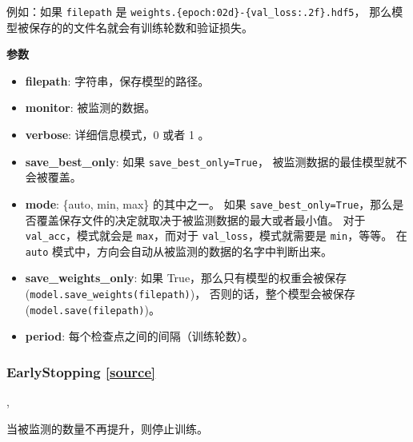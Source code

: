 例如：如果 \texttt{filepath} 是
\texttt{weights.\{epoch:02d\}-\{val\_loss:.2f\}.hdf5}，
那么模型被保存的的文件名就会有训练轮数和验证损失。

\textbf{参数}

\begin{itemize}
\tightlist
\item
  \textbf{filepath}: 字符串，保存模型的路径。
\item
  \textbf{monitor}: 被监测的数据。
\item
  \textbf{verbose}: 详细信息模式，0 或者 1 。
\item
  \textbf{save\_best\_only}: 如果 \texttt{save\_best\_only=True}，
  被监测数据的最佳模型就不会被覆盖。
\item
  \textbf{mode}: \{auto, min, max\} 的其中之一。 如果
  \texttt{save\_best\_only=True}，那么是否覆盖保存文件的决定就取决于被监测数据的最大或者最小值。
  对于 \texttt{val\_acc}，模式就会是 \texttt{max}，而对于
  \texttt{val\_loss}，模式就需要是 \texttt{min}，等等。 在 \texttt{auto}
  模式中，方向会自动从被监测的数据的名字中判断出来。
\item
  \textbf{save\_weights\_only}: 如果 True，那么只有模型的权重会被保存
  (\texttt{model.save\_weights(filepath)})， 否则的话，整个模型会被保存
  (\texttt{model.save(filepath)})。
\item
  \textbf{period}: 每个检查点之间的间隔（训练轮数）。
\end{itemize}



\subsubsection{EarlyStopping  {\href{https://github.com/keras-team/keras/blob/master/keras/callbacks.py\#L432}{{[}source{]}}}}

\begin{Shaded}
\begin{Highlighting}[]
\OperatorTok{=}\OperatorTok{=}\OperatorTok{=}, \\
\hspace{3cm}\OperatorTok{=}\OperatorTok{=}\NormalTok{)}
\end{Highlighting}
\end{Shaded}

当被监测的数量不再提升，则停止训练。

